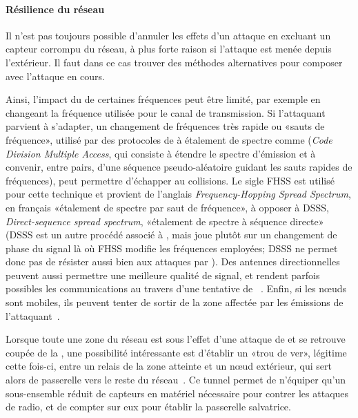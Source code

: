 \paragraph{Résilience du réseau}
Il n'est pas toujours possible d'annuler les effets d'un attaque en excluant un capteur corrompu du réseau, à plus forte raison si l'attaque est menée depuis l'extérieur.
Il faut dans ce cas trouver des méthodes alternatives pour composer avec l'attaque en cours.

Ainsi, l'impact du  de certaines fréquences peut être limité, par exemple en changeant la fréquence utilisée pour le canal de transmission.
Si l'attaquant parvient à s'adapter, un changement de fréquences très rapide ou «sauts de fréquence», utilisé par des protocoles de  à étalement de spectre comme \cdma (\textit{Code Division Multiple Access}, qui consiste à étendre le spectre d'émission et à convenir, entre pairs, d'une séquence pseudo-aléatoire guidant les sauts rapides de fréquences), peut permettre d'échapper au collisions.
Le sigle FHSS est utilisé pour cette technique et provient de l'anglais \textit{Frequency-Hopping Spread Spectrum}, en français «étalement de spectre par saut de fréquence», à opposer à DSSS, \textit{Direct-sequence spread spectrum}, \cad «étalement de spectre à séquence directe» (DSSS est un autre procédé associé à \cdma, mais joue plutôt sur un changement de phase du signal là où FHSS modifie les fréquences employées; DSSS ne permet donc pas de résister aussi bien aux attaques par ).
Des antennes directionnelles peuvent aussi permettre une meilleure qualité de signal, et rendent parfois possibles les communications au travers d'une tentative de ~\cite{PI11}.
Enfin, si les nœuds sont mobiles, ils peuvent tenter de sortir de la zone affectée par les émissions de l'attaquant~\cite{PI11}.

Lorsque toute une zone du réseau est sous l'effet d'une attaque de  et se retrouve coupée de la \sdb, une possibilité intéressante est d'établir un «trou de ver», légitime cette fois-ci, entre un relais de la zone atteinte et un nœud extérieur, qui sert alors de passerelle vers le reste du réseau~\cite{CCH07}.
Ce tunnel permet de n'équiper qu'un sous-ensemble réduit de capteurs en matériel nécessaire pour contrer les attaques de  radio, et de compter sur eux pour établir la passerelle salvatrice.

